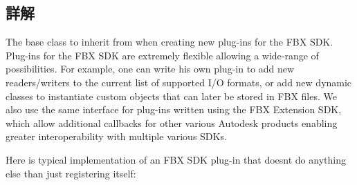 \subsection{詳解}
The base class to inherit from when creating new plug-\/ins for the F\+BX S\+DK. Plug-\/ins for the F\+BX S\+DK are extremely flexible allowing a wide-\/range of possibilities. For example, one can write his own plug-\/in to add new readers/writers to the current list of supported I/O formats, or add new dynamic classes to instantiate custom objects that can later be stored in F\+BX files. We also use the same interface for plug-\/ins written using the F\+BX Extension S\+DK, which allow additional callbacks for other various Autodesk products enabling greater interoperability with multiple various S\+D\+Ks.

Here is typical implementation of an F\+BX S\+DK plug-\/in that doesn\textquotesingle{}t do anything else than just registering itself\+: 
